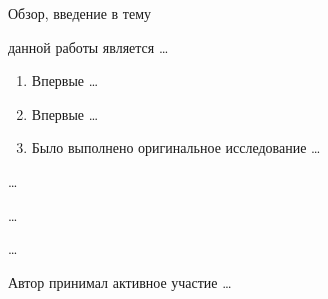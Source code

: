 
{\actuality} Обзор, введение в тему

{\aim} данной работы является \ldots


{\novelty}
\begin{enumerate}
  \item Впервые \ldots
  \item Впервые \ldots
  \item Было выполнено оригинальное исследование \ldots
\end{enumerate}

{\influence} \ldots

{\methods} \ldots

{\probation} \ldots

{\contribution} Автор принимал активное участие \ldots

